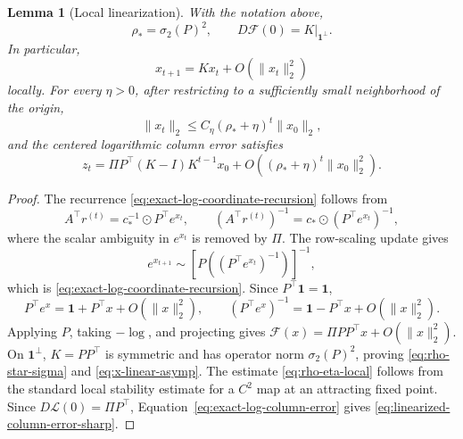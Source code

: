 \documentclass[10pt]{article}
\numberwithin{equation}{section}
\theoremstyle{plain}
\newtheorem{lemma}[theorem]{Lemma}
\theoremstyle{definition}
\theoremstyle{remark}
\newcommand{\ones}{\mathbf{1}}
\begin{document}
\begin{lemma}[Local linearization]\label{lem:local-linearization}
With the notation above,
\begin{equation}\label{eq:rho-star-sigma}
        \rho_* = \sigma_2(P)^2,
        \qquad
        D\mathcal F(0)=K|_{\ones^\perp}.
\end{equation}
In particular,
\begin{equation}\label{eq:x-linear-asymp}
        x_{t+1}=Kx_t+O(\|x_t\|_2^2)
\end{equation}
locally. For every \(\eta>0\), after restricting to a sufficiently small
neighborhood of the origin,
\begin{equation}\label{eq:rho-eta-local}
        \|x_t\|_2\le C_\eta(\rho_*+\eta)^t\|x_0\|_2,
\end{equation}
and the centered logarithmic column error satisfies
\begin{equation}\label{eq:linearized-column-error-sharp}
        z_t
        =
        \Pi P^\top(K-I)K^{t-1}x_0
        +O\!\left((\rho_*+\eta)^t\|x_0\|_2^2\right).
\end{equation}
\end{lemma}

\begin{proof}
The recurrence \eqref{eq:exact-log-coordinate-recursion} follows from
\[
        A^\top r^{(t)}=c_*^{-1}\odot P^\top e^{x_t},
        \qquad
        (A^\top r^{(t)})^{-1}=c_*\odot(P^\top e^{x_t})^{-1},
\]
where the scalar ambiguity in \(e^{x_t}\) is removed by \(\Pi\). The row-scaling
update gives
\[
        e^{x_{t+1}}
        \sim
        \left[P\left((P^\top e^{x_t})^{-1}\right)\right]^{-1},
\]
which is \eqref{eq:exact-log-coordinate-recursion}. Since \(P^\top\ones=\ones\),
\[
        P^\top e^x=\ones+P^\top x+O(\|x\|_2^2),
        \qquad
        (P^\top e^x)^{-1}=\ones-P^\top x+O(\|x\|_2^2).
\]
Applying \(P\), taking \(-\log\), and projecting gives
\(
\mathcal F(x)=\Pi PP^\top x+O(\|x\|_2^2).
\)
On \(\ones^\perp\), \(K=PP^\top\) is symmetric and has operator norm
\(\sigma_2(P)^2\), proving \eqref{eq:rho-star-sigma} and
\eqref{eq:x-linear-asymp}. The estimate \eqref{eq:rho-eta-local} follows from the
standard local stability estimate for a \(C^2\) map at an attracting fixed point.
Since \(D\mathcal L(0)=\Pi P^\top\), Equation~\eqref{eq:exact-log-column-error} gives \eqref{eq:linearized-column-error-sharp}.
\end{proof}
\end{document}
